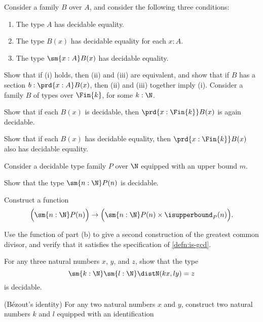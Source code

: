 \begin{exercises}
  \exitem \label{ex:has-decidable-equality-Sigma}Consider a family $B$ over $A$, and consider the following three conditions:
  \begin{enumerate}
  \item The type $A$ has decidable equality.
  \item The type $B(x)$ has decidable equality for each $x:A$.
  \item The type $\sm{x:A}B(x)$ has decidable equality.
  \end{enumerate}
  Show that if (i) holds, then (ii) and (iii) are equivalent, and show that if $B$ has a section $b:\prd{x:A}B(x)$, then (ii) and (iii) together imply (i).
  \exitem Consider a family $B$ of types over $\Fin{k}$, for some $k:\N$.
  \begin{subexenum}
  \item Show that if each $B(x)$ is decidable, then $\prd{x:\Fin{k}}B(x)$ is again decidable.
  \item Show that if each $B(x)$ has decidable equality, then $\prd{x:\Fin{k}}B(x)$ also has decidable equality.
  \end{subexenum}
  \exitem \label{ex:maximal-element}Consider a decidable type family $P$ over $\N$ equipped with an upper bound $m$.
  \begin{subexenum}
  \item Show that the type $\sm{n:\N}P(n)$ is decidable.
  \item Construct a function
  \begin{equation*}
    \Big(\sm{n:\N}P(n)\Big)\to\Big(\sm{n:\N}P(n)\times\isupperbound_P(n)\Big).
  \end{equation*}
  \item Use the function of part (b) to give a second construction of the greatest common divisor, and verify that it satisfies the specification of \cref{defn:is-gcd}.
  \end{subexenum}
  \exitem \label{ex:bezouts-identity-N}
  \begin{subexenum}
  \item For any three natural numbers $x$, $y$, and $z$, show that the type
    \begin{equation*}
      \sm{k:\N}\sm{l:\N}\distN(kx,ly)=z
    \end{equation*}
    is decidable.
  \item (B\'ezout's identity) For any two natural numbers $x$ and $y$, construct two natural numbers $k$ and $l$ equipped with an identification

\end{subexenum}
\end{exercises}
